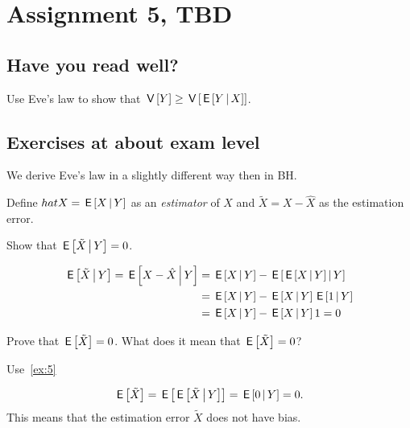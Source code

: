 \documentclass[assignments]{subfiles}
\begin{document}
\section{Assignment 5, TBD}

\subsection{Have you read well?}


\begin{exercise}
Use Eve's law to show that $\,\mathsf{V}\left[Y\right] \geq \,\mathsf{V}\left[\,\mathsf{E}\left[Y\,\middle|\, X\right]\right]$.
\end{exercise}


\subsection{Exercises at about exam level}
\label{sec:exercises-at-about-1}

We derive Eve's law in a slightly different way then in BH.

Define $hat X = \,\mathsf{E}\left[X\,\middle|\, Y\right]$ as an \emph{estimator} of $X$ and $\tilde X = X - \hat X$ as the estimation error.

\begin{exercise}\label{ex:5}
Show that $\,\mathsf{E}\left[\tilde X\,\middle|\, Y\right] = 0$.
\begin{solution}
\begin{align}
\label{eq:4}
\,\mathsf{E}\left[\tilde X \,\middle|\, Y\right] = \,\mathsf{E}\left[X - \hat X \,\middle|\, Y\right] &=
\,\mathsf{E}\left[X\,\middle|\, Y\right]  - \,\mathsf{E}\left[ \,\mathsf{E}\left[X\,\middle|\, Y\right]\,\middle|\, Y\right]  \\
&=\,\mathsf{E}\left[X\,\middle|\, Y\right]  -  \,\mathsf{E}\left[X\,\middle|\, Y\right]\,\mathsf{E}\left[1\,\middle|\, Y\right]  \\
&=\,\mathsf{E}\left[X\,\middle|\, Y\right]  -  \,\mathsf{E}\left[X\,\middle|\, Y\right]1 = 0
\end{align}
\end{solution}
\end{exercise}

\begin{exercise}\label{ex:4}
Prove that $\,\mathsf{E}\left[\tilde X\right] = 0$. What does it mean that $\,\mathsf{E}\left[\tilde X\right] =0$?
\begin{hint}
  Use~\cref{ex:5}
\end{hint}
\begin{solution}
\begin{equation}
\label{eq:5}
\,\mathsf{E}\left[\tilde X\right] = \,\mathsf{E}\left[\,\mathsf{E}\left[\tilde X\,\middle|\, Y\right]\right] = \,\mathsf{E}\left[ 0 \,\middle|\, Y\right] =0.
\end{equation}
This means that the estimation error $\tilde X$ does not have bias.
\end{solution}
\end{exercise}
\end{document}
